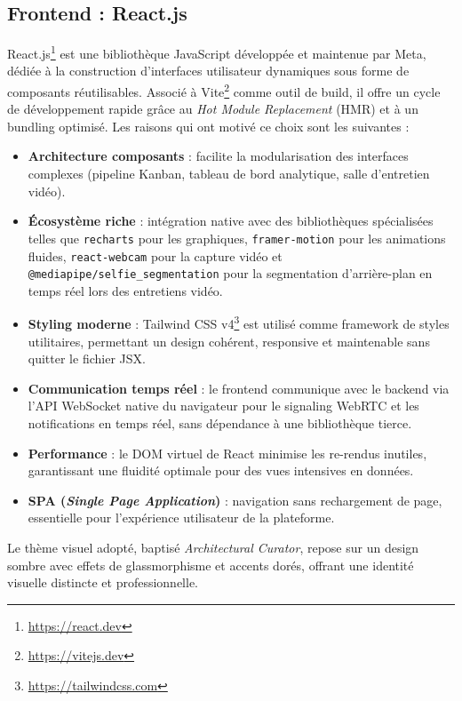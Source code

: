 \subsection{Frontend : React.js}
React.js\footnote{\url{https://react.dev}} est une bibliothèque JavaScript développée et maintenue par Meta, dédiée à la construction d'interfaces utilisateur dynamiques sous forme de composants réutilisables. Associé à Vite\footnote{\url{https://vitejs.dev}} comme outil de build, il offre un cycle de développement rapide grâce au \textit{Hot Module Replacement} (HMR) et à un bundling optimisé.
\noindent Les raisons qui ont motivé ce choix sont les suivantes :
\begin{itemize}
    \item \textbf{Architecture composants} : facilite la modularisation des interfaces complexes (pipeline Kanban, tableau de bord analytique, salle d'entretien vidéo).
    \item \textbf{Écosystème riche} : intégration native avec des bibliothèques spécialisées telles que \texttt{recharts} pour les graphiques, \texttt{framer-motion} pour les animations fluides, \texttt{react-webcam} pour la capture vidéo et \texttt{@mediapipe/selfie\_segmentation} pour la segmentation d'arrière-plan en temps réel lors des entretiens vidéo.
    \item \textbf{Styling moderne} : Tailwind CSS v4\footnote{\url{https://tailwindcss.com}} est utilisé comme framework de styles utilitaires, permettant un design cohérent, responsive et maintenable sans quitter le fichier JSX.
    \item \textbf{Communication temps réel} : le frontend communique avec le backend via l'API WebSocket native du navigateur pour le signaling WebRTC et les notifications en temps réel, sans dépendance à une bibliothèque tierce.
    \item \textbf{Performance} : le DOM virtuel de React minimise les re-rendus inutiles, garantissant une fluidité optimale pour des vues intensives en données.
    \item \textbf{SPA (\textit{Single Page Application})} : navigation sans rechargement de page, essentielle pour l'expérience utilisateur de la plateforme.
\end{itemize}
\noindent Le thème visuel adopté, baptisé \textit{Architectural Curator}, repose sur un design sombre avec effets de glassmorphisme et accents dorés, offrant une identité visuelle distincte et professionnelle.
